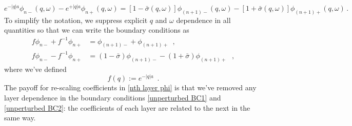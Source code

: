 \documentclass[submission, Phys]{SciPost}
\newcommand{\lb}{\left[}
\newcommand{\rb}{\right]}
\begin{document}
\begin{equation}
    \label{superlattice discont init expression}
    e^{-|q|a} \phi_{n-}(q,\omega) - e^{+|q|a}\phi_{n+}(q,\omega) = 
   \lb1-\bar\sigma(q,\omega)\rb \phi_{(n+1)-}(q,\omega)-\lb1+\bar\sigma(q,\omega)\rb \phi_{(n+1)+}(q,\omega)
   \,.
\end{equation}
To simplify the notation, we suppress explicit $q$ and $\omega$ dependence in all quantities so that we can write the boundary conditions as
\begin{align}
    \label{unperturbed BC1}
    f \phi_{n-} + f^{-1}\phi_{n+} &= \phi_{(n+1)-} + \phi_{(n+1)+}
    \,\,\,,
    \\
    \label{unperturbed BC2}
    f \phi_{n-} - f^{-1}\phi_{n+} &= (1-\bar\sigma)\phi_{(n+1)-}-(1+\bar\sigma)\phi_{(n+1)+}
    \,\,\,\,,
\end{align}
where we've defined
\begin{equation}
    \label{f def}
    f(q):=e^{-|q|a}
    \,\,\,.
\end{equation}
The payoff for re-scaling coefficients in \eqref{nth layer phi} is that we've  removed any layer dependence in the boundary conditions \eqref{unperturbed BC1} and \eqref{unperturbed BC2}: the coefficients of each layer are related to the next in the same way.
\end{document}
